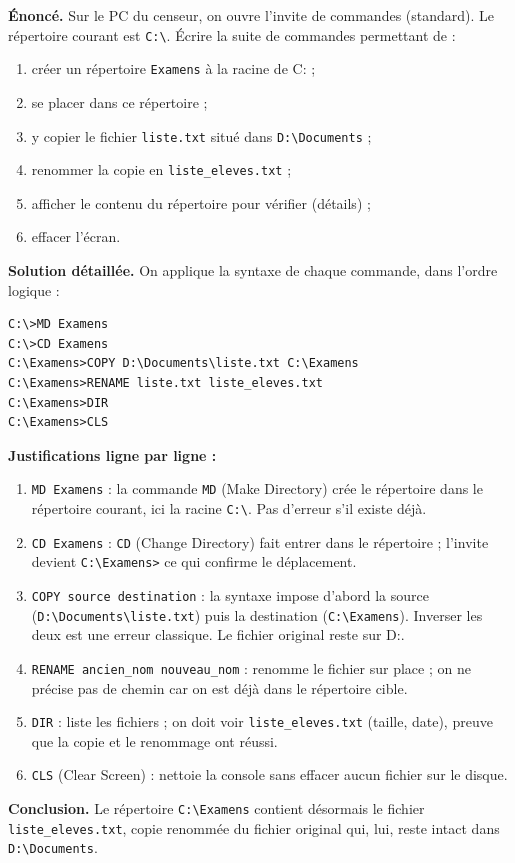 \documentclass[11pt]{article}
\begin{document}
\begin{exoresolu}
\textbf{Énoncé.} Sur le PC du censeur, on ouvre l'invite de commandes (standard). Le répertoire courant est \texttt{C:\textbackslash}. Écrire la suite de commandes permettant de :
\begin{enumerate}
  \item créer un répertoire \texttt{Examens} à la racine de C: ;
  \item se placer dans ce répertoire ;
  \item y copier le fichier \texttt{liste.txt} situé dans \texttt{D:\textbackslash Documents} ;
  \item renommer la copie en \texttt{liste\_eleves.txt} ;
  \item afficher le contenu du répertoire pour vérifier (détails) ;
  \item effacer l'écran.
\end{enumerate}
\tcblower
\textbf{Solution détaillée.} On applique la syntaxe de chaque commande, dans l'ordre logique :

\begin{lstlisting}
C:\>MD Examens
C:\>CD Examens
C:\Examens>COPY D:\Documents\liste.txt C:\Examens
C:\Examens>RENAME liste.txt liste_eleves.txt
C:\Examens>DIR
C:\Examens>CLS
\end{lstlisting}

\textbf{Justifications ligne par ligne :}
\begin{enumerate}
  \item \texttt{MD Examens} : la commande \texttt{MD} (Make Directory) crée le répertoire dans le répertoire courant, ici la racine \texttt{C:\textbackslash}. Pas d'erreur s'il existe déjà.
  \item \texttt{CD Examens} : \texttt{CD} (Change Directory) fait entrer dans le répertoire ; l'invite devient \texttt{C:\textbackslash Examens>} ce qui confirme le déplacement.
  \item \texttt{COPY source destination} : la syntaxe impose d'abord la source (\texttt{D:\textbackslash Documents\textbackslash liste.txt}) puis la destination (\texttt{C:\textbackslash Examens}). Inverser les deux est une erreur classique. Le fichier original reste sur D:.
  \item \texttt{RENAME ancien\_nom nouveau\_nom} : renomme le fichier sur place ; on ne précise pas de chemin car on est déjà dans le répertoire cible.
  \item \texttt{DIR} : liste les fichiers ; on doit voir \texttt{liste\_eleves.txt} (taille, date), preuve que la copie et le renommage ont réussi.
  \item \texttt{CLS} (Clear Screen) : nettoie la console sans effacer aucun fichier sur le disque.
\end{enumerate}

\textbf{Conclusion.} Le répertoire \texttt{C:\textbackslash Examens} contient désormais le fichier \texttt{liste\_eleves.txt}, copie renommée du fichier original qui, lui, reste intact dans \texttt{D:\textbackslash Documents}.
\end{exoresolu}
\end{document}
